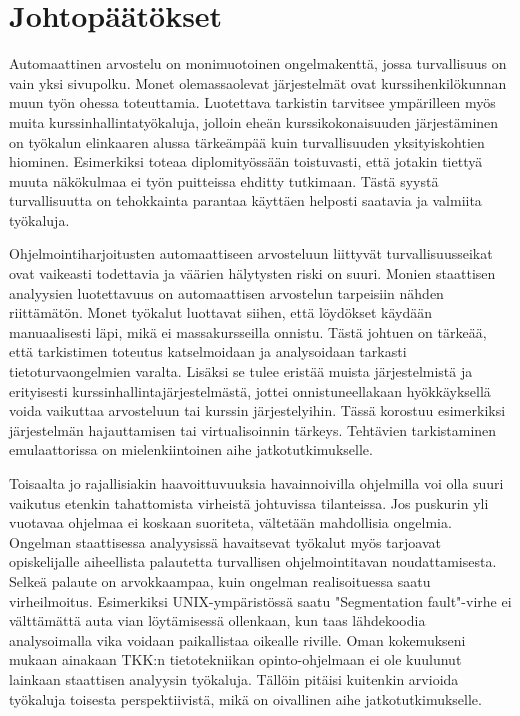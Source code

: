 
\section{Johtopäätökset}
\label{sec:paketointi}

Automaattinen arvostelu on monimuotoinen ongelmakenttä, jossa turvallisuus
on vain yksi sivupolku. Monet olemassaolevat järjestelmät ovat
kurssihenkilökunnan muun työn ohessa toteuttamia. Luotettava tarkistin
tarvitsee ympärilleen myös muita kurssinhallintatyökaluja, jolloin
eheän kurssikokonaisuuden järjestäminen on työkalun elinkaaren alussa
tärkeämpää kuin turvallisuuden yksityiskohtien hiominen. Esimerkiksi
\citet{Hiisila2005} toteaa diplomityössään toistuvasti, että jotakin tiettyä
muuta näkökulmaa ei työn puitteissa ehditty tutkimaan. Tästä syystä
turvallisuutta on tehokkainta parantaa käyttäen helposti saatavia ja valmiita
työkaluja.

Ohjelmointiharjoitusten automaattiseen arvosteluun liittyvät turvallisuusseikat
ovat vaikeasti todettavia ja väärien hälytysten riski on suuri. Monien
staattisen analyysien luotettavuus on automaattisen arvostelun tarpeisiin
nähden riittämätön. Monet työkalut luottavat siihen, että löydökset käydään
manuaalisesti läpi, mikä ei massakursseilla onnistu. Tästä johtuen on tärkeää,
että tarkistimen toteutus katselmoidaan ja analysoidaan tarkasti
tietoturvaongelmien varalta. Lisäksi se tulee eristää muista järjestelmistä ja
erityisesti kurssinhallintajärjestelmästä, jottei onnistuneellakaan
hyökkäyksellä voida vaikuttaa arvosteluun tai kurssin järjestelyihin. Tässä
korostuu esimerkiksi järjestelmän hajauttamisen tai virtualisoinnin tärkeys.
Tehtävien tarkistaminen emulaattorissa on mielenkiintoinen aihe
jatkotutkimukselle.

Toisaalta jo rajallisiakin haavoittuvuuksia havainnoivilla ohjelmilla voi olla
suuri vaikutus etenkin tahattomista virheistä johtuvissa tilanteissa. Jos
puskurin yli vuotavaa ohjelmaa ei koskaan suoriteta, vältetään
mahdollisia ongelmia. Ongelman staattisessa analyysissä havaitsevat työkalut
myös tarjoavat opiskelijalle aiheellista palautetta turvallisen ohjelmointitavan
noudattamisesta. Selkeä palaute on arvokkaampaa, kuin ongelman realisoituessa
saatu virheilmoitus. Esimerkiksi UNIX-ympäristössä saatu
"Segmentation fault"-virhe ei välttämättä auta vian löytämisessä ollenkaan, kun
taas lähdekoodia analysoimalla vika voidaan paikallistaa oikealle riville. Oman
kokemukseni mukaan ainakaan TKK:n tietotekniikan opinto-ohjelmaan ei ole
kuulunut lainkaan staattisen analyysin työkaluja. Tällöin pitäisi kuitenkin
arvioida työkaluja toisesta perspektiivistä, mikä on oivallinen aihe
jatkotutkimukselle.

